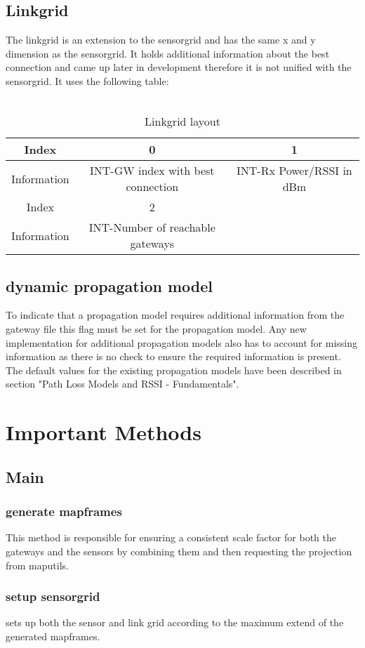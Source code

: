 \documentclass[12pt,a4paper]{article}
\begin{document}
\subsection{Linkgrid}
The linkgrid is an extension to the sensorgrid and has the same x and y dimension as the sensorgrid. It holds additional information about the best connection and came up later in development therefore it is not unified with the sensorgrid. It uses the following table:\\
\\
\begin{table}[!th]
	\centering
	\caption{Linkgrid layout}
\begin{tabular}{|c|c|c|}
	\hline
	Index&0&1\\ \hline
	Information&INT-GW index with best connection&INT-Rx Power/RSSI in dBm\\ \hline
	Index&2&\\ \hline
	Information&INT-Number of reachable gateways&\\ \hline
\end{tabular}
\end{table}
\subsection{dynamic propagation model}
To indicate that a propagation model requires additional information from the gateway file this flag must be set for the propagation model. Any new implementation for additional propagation models also has to account for missing information as there is no check to ensure the required information is present. The default values for the existing propagation models have been described in section "Path Loss Models and RSSI - Fundamentals".
\section{Important Methods}
\subsection{Main}
\subsubsection{generate mapframes}
This method is responsible for ensuring a consistent scale factor for both the gateways and the sensors by combining them and then requesting the projection from maputils.
\subsubsection{setup sensorgrid}
sets up both the sensor and link grid according to the maximum extend of the generated mapframes.
\end{document}
